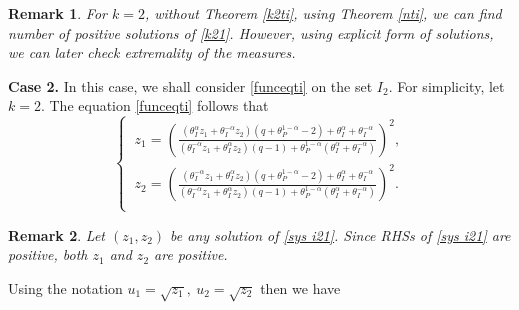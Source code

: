 \documentclass[sn-mathphys]{sn-jnl}%
\theoremstyle{thmstyleone}%
\theoremstyle{thmstyletwo}%
\newtheorem{remark}{Remark}%
\theoremstyle{thmstylethree}%
\begin{document}
\begin{remark}\label{compare}
For $k=2$, without Theorem \ref{k2ti}, using Theorem \ref{nti}, we can find number of positive solutions of \eqref{k21}. However, using explicit form of solutions, we can later check  extremality of the measures.
\end{remark}
\textbf{Case 2.} In this case, we shall consider \eqref{funceqti} on the set $I_2$. For simplicity, let $k=2$.  The equation \eqref{funceqti} follows that
\begin{equation}\label{sys i21}
\left\{
\begin{array}{llll}
\ z_{1}=\left(\frac{(\theta_I^{\alpha}z_1+\theta_I^{-\alpha}z_2)(q+\theta_P^{1-\alpha}-2)+\theta_I^{\alpha}+\theta_I^{-\alpha}}{(\theta_I^{-\alpha}z_1+\theta_I^{\alpha}z_2)(q-1)+\theta_P^{1-\alpha}(\theta_I^{\alpha}+\theta_I^{-\alpha})}\right)^2,\\[3mm]
\ z_{2}=\left(\frac{(\theta_I^{-\alpha}z_1+\theta_I^{\alpha}z_2)(q+\theta_P^{1-\alpha}-2)+\theta_I^{\alpha}+\theta_I^{-\alpha}}{(\theta_I^{-\alpha}z_1+\theta_I^{\alpha}z_2)(q-1)+\theta_P^{1-\alpha}(\theta_I^{\alpha}+\theta_I^{-\alpha})}\right)^2.\\[3mm]
\end{array}\right.
\end{equation}

\begin{remark}\label{positive}
Let $(z_1,z_2)$ be any solution of \eqref{sys i21}. Since RHSs of \eqref{sys i21} are positive, both $z_1$ and $z_2$ are positive.
\end{remark}

Using the notation $u_1=\sqrt{z_1},\ u_2=\sqrt{z_2}$ then we have
\end{document}
